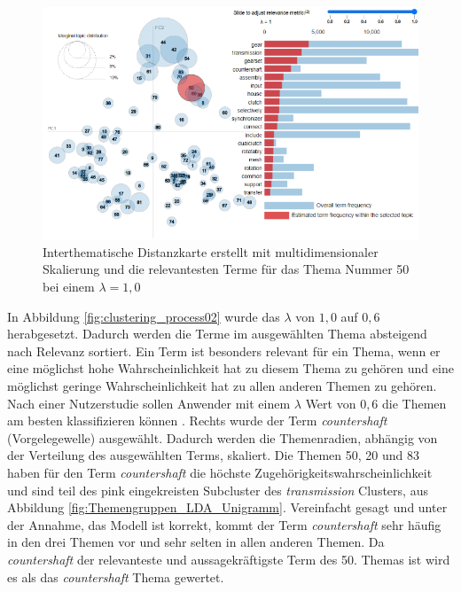 \begin{landscape}
 \begin{figure}
	\centering
	\label{fig:clustering_process01}
	\includegraphics[width=19.29cm,keepaspectratio=true]{img/clustering_process01.png}
	\caption{
		Interthematische Distanzkarte erstellt mit multidimensionaler Skalierung und die relevantesten Terme für das Thema Nummer 50 bei einem $\lambda = 1,0$
	}
	
 \end{figure}
\end{landscape}

 
 
In Abbildung \ref{fig:clustering_process02} wurde das $\lambda$ von $1,0$ auf $0,6$ herabgesetzt. Dadurch werden die Terme im ausgewählten Thema absteigend nach Relevanz sortiert. Ein Term ist besonders relevant für ein Thema, wenn er eine möglichst hohe Wahrscheinlichkeit hat zu diesem Thema zu gehören und eine möglichst geringe Wahrscheinlichkeit hat zu allen anderen Themen zu gehören. Nach einer Nutzerstudie sollen Anwender mit einem  $\lambda$ Wert von $0,6$ die Themen am besten klassifizieren können \parencite[vgl.][S. 66-68]{sievert2014ldavis}. Rechts wurde der Term \emph{countershaft} (Vorgelegewelle) ausgewählt. Dadurch werden die Themenradien, abhängig von der Verteilung des ausgewählten Terms, skaliert. Die Themen 50, 20 und 83 haben für den Term \emph{countershaft} die höchste Zugehörigkeitswahrscheinlichkeit und sind teil des pink eingekreisten Subcluster des \emph{transmission} Clusters, aus Abbildung \ref{fig:Themengruppen_LDA_Unigramm}. Vereinfacht gesagt und unter der Annahme, das Modell ist korrekt, kommt der Term \emph{countershaft} sehr häufig in den drei Themen vor und sehr selten in allen anderen Themen. Da \emph{countershaft} der relevanteste und aussagekräftigste Term des 50. Themas ist wird es als das \emph{countershaft} Thema gewertet.

